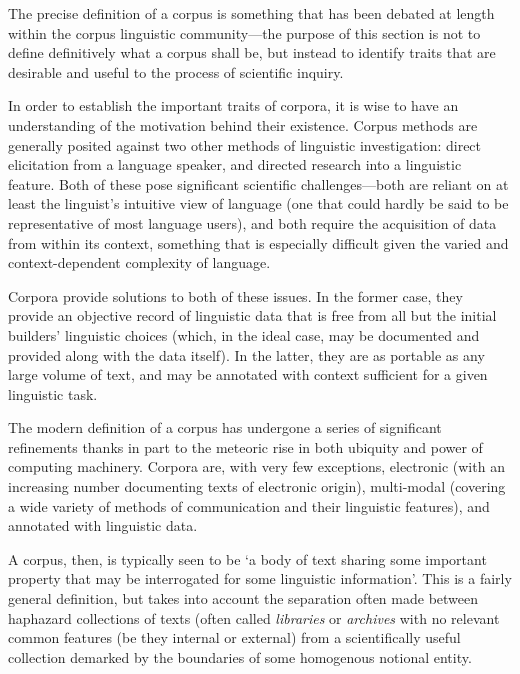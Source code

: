 The precise definition of a corpus is something that has been debated at length within the corpus linguistic community---the purpose of this section is not to define definitively what a corpus shall be, but instead to identify traits that are desirable and useful to the process of scientific inquiry.



In order to establish the important traits of corpora, it is wise to have an understanding of the motivation behind their existence.  Corpus methods are generally posited against two other methods of linguistic investigation: direct elicitation from a language speaker, and directed research into a linguistic feature.  Both of these pose significant scientific challenges---both are reliant on at least the linguist's intuitive view of language (one that could hardly be said to be representative of most language users), and both require the acquisition of data from within its context, something that is especially difficult given the varied and context-dependent complexity of language.

Corpora provide solutions to both of these issues.  In the former case, they provide an objective record of linguistic data that is free from all but the initial builders' linguistic choices (which, in the ideal case, may be documented and provided along with the data itself).  In the latter, they are as portable as any large volume of text, and may be annotated with context sufficient for a given linguistic task.


The modern definition of a corpus has undergone a series of significant refinements thanks in part to the meteoric rise in both ubiquity and power of computing machinery.  Corpora are, with very few exceptions, electronic (with an increasing number documenting texts of electronic origin), multi-modal (covering a wide variety of methods of communication and their linguistic features), and annotated with linguistic data.  


A corpus, then, is typically seen to be `a body of text sharing some important property that may be interrogated for some linguistic information'.  This is a fairly general definition, but takes into account the separation often made between haphazard collections of texts (often called \textsl{libraries} or \textsl{archives} with no relevant common features (be they internal or external) from a scientifically useful collection demarked by the boundaries of some homogenous notional entity.


